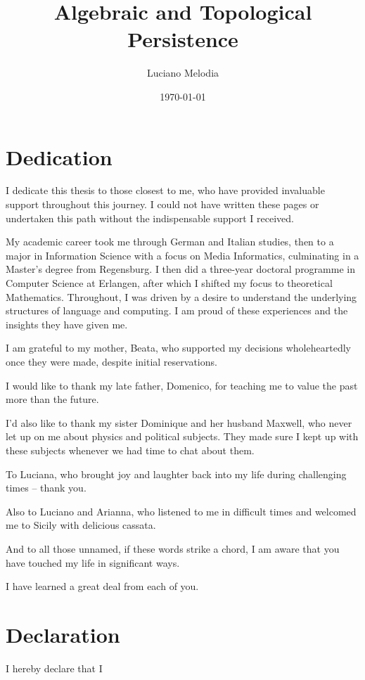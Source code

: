 \documentclass[12pt]{report}
\title{Algebraic and Topological Persistence}
\author{Luciano Melodia}
\date{\today}
\numberwithin{conj}{section}
\begin{document}
\vspace{0.5cm}



\chapter*{Dedication}
I dedicate this thesis to those closest to me, who have provided invaluable support throughout this journey. I could not have written these pages or undertaken this path without the indispensable support I received.

My academic career took me through German and Italian studies, then to a major in Information Science with a focus on Media Informatics, culminating in a Master's degree from Regensburg. I then did a three-year doctoral programme in Computer Science at Erlangen, after which I shifted my focus to theoretical Mathematics. Throughout, I was driven by a desire to understand the underlying structures of language and computing. I am proud of these experiences and the insights they have given me.

I am grateful to my mother, Beata, who supported my decisions wholeheartedly once they were made, despite initial reservations.

I would like to thank my late father, Domenico, for teaching me to value the past more than the future.

I'd also like to thank my sister Dominique and her husband Maxwell, who never let up on me about physics and political subjects. They made sure I kept up with these subjects whenever we had time to chat about them.

To Luciana, who brought joy and laughter back into my life during challenging times -- thank you.

Also to Luciano and Arianna, who listened to me in difficult times and welcomed me to Sicily with delicious cassata.

And to all those unnamed, if these words strike a chord, I am aware that you have touched my life in significant ways.

I have learned a great deal from each of you.

\chapter*{Declaration}
I hereby declare that I
\end{document}
